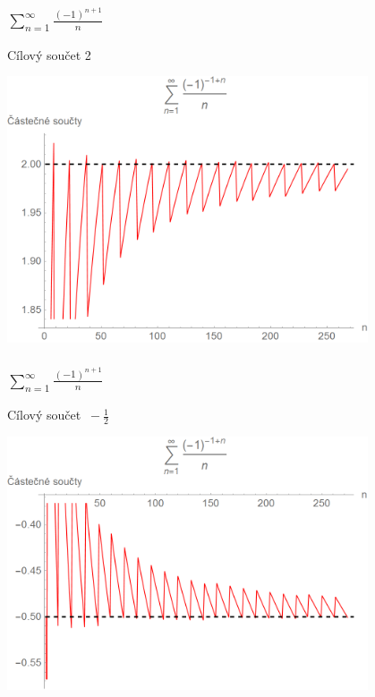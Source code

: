 \documentclass{beamer}
\begin{document}
\begin{frame}
  \frametitle{\(\sum _{n=1} ^{\infty} \frac{(-1)^{n+1}}{n}\)}
  Cílový součet 2
  \begin{center}
    \includegraphics[width=0.8\textwidth]{serie1_2.png}
  \end{center}
\end{frame}

\begin{frame}
  \frametitle{\(\sum _{n=1} ^{\infty} \frac{(-1)^{n+1}}{n}\)}
  Cílový součet \(\ -\frac{1}{2}\)
  \begin{center}
    \includegraphics[width=0.8\textwidth]{serie1_3.png}
  \end{center}
\end{frame}
\end{document}
